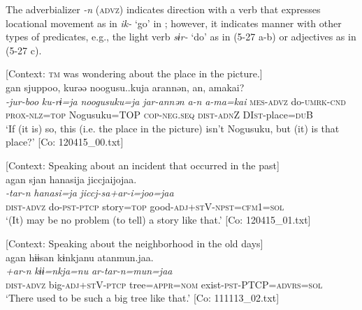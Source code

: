 The adverbializer \textit{{}-n} (\textsc{advz}) indicates direction with a verb that expresses locational movement as in \textit{ik-} ‘go’ in ; however, it indicates manner with other types of predicates, e.g., the light verb \textit{sɨr-} ‘do’ as in (5-27 a-b) or adjectives as in (5-27 c).

\ea \label{ex:5:27}  \ea \label{ex:5:27a} [Context: \textsc{tm} was wondering about the place in the picture.]\\
\gll  gan  sjuppoo,  kurəə  noogusu..kuja   arannən,  an,  amakai?\\
      \textit{}  \textit{-jur-boo}  \textit{ku-rɨ=ja}  \textit{noogusuku=ja} \textit{jar-annən}  \textit{a-n}  \textit{a-ma=kai}
      \textsc{mes}-\textsc{advz}  do-\textsc{umrk}-\textsc{cnd}  \textsc{prox}-\textsc{nlz}=\textsc{top}  Nogusuku=TOP  \textsc{cop}-\textsc{neg}.\textsc{seq}  \textsc{dist}-\textsc{adn}Z  DI\textsc{st}-place=\textsc{du}B\\
\glt ‘If (it is) so, this (i.e. the place in the picture) isn’t Nogusuku, but (it) is that place?’  [Co: 120415\_00.txt]

 \ex \label{ex:5:b} [Context: Speaking about an incident that occurred in the past]\\
\glll  agan  sjan  hanasija  jiccjaijojaa.\\
\textit{}  \textit{-tar-n}  \textit{hanasi=ja}  \textit{jiccj-sa+ar-i=joo=jaa}\\
\textsc{dist}-\textsc{advz}  do-\textsc{pst}-\textsc{ptcp}  story=\textsc{top}  good-\textsc{adj}+\textsc{st}V-\textsc{npst}=\textsc{cfm}1=\textsc{sol}\\
\glt ‘(It) may be no problem (to tell) a story like that.’ [Co: 120415\_01.txt]

 \ex \label{ex:5:c} [Context: Speaking about the neighborhood in the old days]\\
\glll  agan  hɨɨsan  kɨnkjanu   atanmun.jaa.\\
      \textit{}  \textit{+ar-n}  \textit{kɨɨ=nkja=nu}   \textit{ar-tar-n=mun=jaa}\\                                                                  
      \textsc{dist}-\textsc{advz}  big-\textsc{adj}+\textsc{st}V-\textsc{ptcp}  tree=\textsc{appr}=\textsc{nom} exist-\textsc{pst}-PTCP=\textsc{advrs}=\textsc{sol}\\
\glt ‘There used to be such a big tree like that.’ [Co: 111113\_02.txt]
\z
\z

